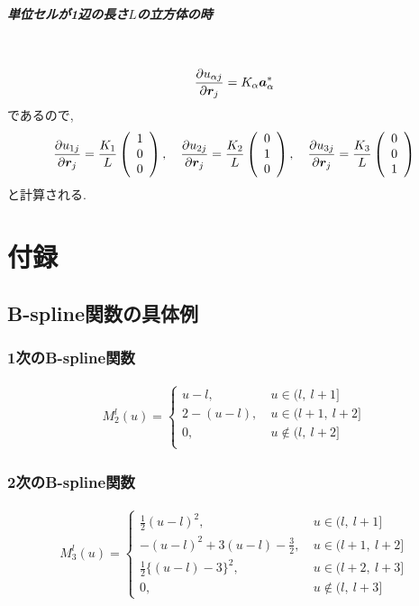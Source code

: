 \subparagraph{単位セルが1辺の長さ$L$の立方体の時} \
\begin{align}
 \frac{\partial u_{\alpha j}}{\partial \bm{r}_{j}} = K_{\alpha}\bm{a}_{\alpha}^{*}
 \notag
\end{align}
であるので,
\begin{align}
 \frac{\partial u_{1 j}}{\partial \bm{r}_{j}}
 = \frac{K_{1}}{L}
    \left(
          \begin{array}{c}
            1 \\ 0 \\ 0
          \end{array}
    \right)
 ,~~~
  \frac{\partial u_{2 j}}{\partial \bm{r}_{j}}
 = \frac{K_{2}}{L}
    \left(
          \begin{array}{c}
            0 \\ 1 \\ 0
          \end{array}
 \right)
 ,~~~
  \frac{\partial u_{3 j}}{\partial \bm{r}_{j}}
 = \frac{K_{3}}{L}
    \left(
          \begin{array}{c}
            0 \\ 0 \\ 1
          \end{array}
    \right)
 \notag
\end{align}
と計算される.
\clearpage
\section{付録}
\subsection{B-spline関数の具体例}
\subsubsection{1次のB-spline関数}
\begin{align}
  M_{2}^{l}(u)
=
  \begin{cases}
   u-l,~      & u \in    (l,~   l+1] \\
   2-(u-l),~  & u \in    (l+1,~ l+2] \\
   0,~        & u \notin (l,~   l+2] \\
  \end{cases}
\end{align}

\subsubsection{2次のB-spline関数}
\begin{align}
  M_{3}^{l}(u)
=
  \begin{cases}
   \frac{1}{2}(u-l)^{2},~               & u \in    (l,~   l+1] \\
   -(u-l)^{2} + 3(u-l) - \frac{3}{2},~  & u \in    (l+1,~ l+2] \\
   \frac{1}{2}\{(u-l)-3\}^{2},~         & u \in    (l+2,~ l+3] \\
   0,~                                  & u \notin (l,  ~ l+3]
  \end{cases}
\end{align}

